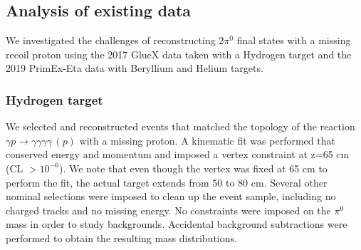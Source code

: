 
\subsection{Analysis of existing data}
We investigated the challenges of reconstructing 2$\pi^0$ final states
with a missing recoil proton using the 2017 GlueX data taken with a
Hydrogen target and the 2019 PrimEx-Eta data with Beryllium and Helium targets.
\subsubsection{Hydrogen target}
  We selected and reconstructed events that matched the
topology of the reaction $\gamma p\rightarrow \gamma \gamma \gamma
\gamma\, (p)$ with a missing proton. A kinematic fit was performed
that conserved energy and momentum and imposed a vertex constraint at
z=65 cm (CL $> 10^{-6}$). We note that even though the vertex was
fixed at 65 cm to perform the fit, the actual target extends from 50
to 80 cm. Several other nominal selections were imposed to clean up
the event sample, including no charged tracks and no missing
energy. No constraints were imposed on the $\pi^0$ mass in order to
study backgrounds. Accidental background subtractions were performed
to obtain the resulting mass distributions.
